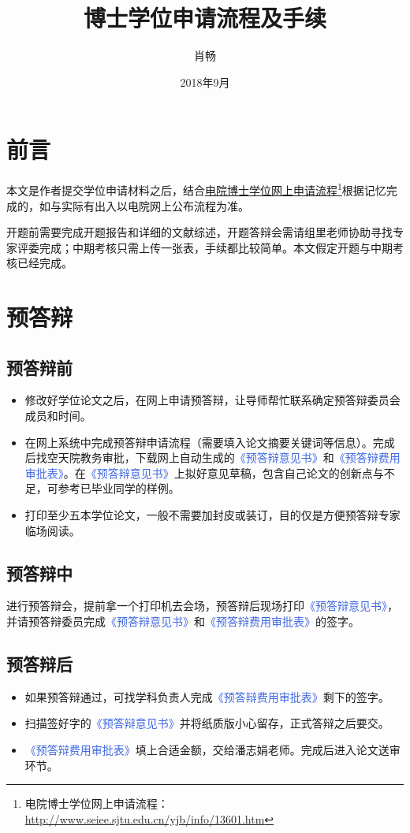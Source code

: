 \documentclass[a4paper, 12pt]{ctexart}
\title{博士学位申请流程及手续}
\author{肖畅}
\date{2018年9月}
\newcommand{\form}[1]{\textcolor{RoyalBlue}{《#1》}}
\begin{document}
\maketitle
\tableofcontents

\section{前言}
本文是作者提交学位申请材料之后，结合\href{http://www.seiee.sjtu.edu.cn/yjb/info/13601.htm}{电院博士学位网上申请流程}\footnote{电院博士学位网上申请流程：\url{http://www.seiee.sjtu.edu.cn/yjb/info/13601.htm}}根据记忆完成的，如与实际有出入以电院网上公布流程为准。

开题前需要完成开题报告和详细的文献综述，开题答辩会需请组里老师协助寻找专家评委完成；中期考核只需上传一张表，手续都比较简单。本文假定开题与中期考核已经完成。

\section{预答辩}
\subsection{预答辩前}
\begin{itemize}
    \item 修改好学位论文之后，在网上申请预答辩，让导师帮忙联系确定预答辩委员会成员和时间。
    \item 在网上系统中完成预答辩申请流程（需要填入论文摘要关键词等信息）。完成后找空天院教务审批，下载网上自动生成的\form{预答辩意见书}和\form{预答辩费用审批表}。在\form{预答辩意见书}上拟好意见草稿，包含自己论文的创新点与不足，可参考已毕业同学的样例。
    \item 打印至少五本学位论文，一般不需要加封皮或装订，目的仅是方便预答辩专家临场阅读。
\end{itemize}
\subsection{预答辩中}
进行预答辩会，提前拿一个打印机去会场，预答辩后现场打印\form{预答辩意见书}，并请预答辩委员完成\form{预答辩意见书}和\form{预答辩费用审批表}的签字。
\subsection{预答辩后}
\begin{itemize}
    \item 如果预答辩通过，可找学科负责人完成\form{预答辩费用审批表}剩下的签字。
    \item 扫描签好字的\form{预答辩意见书}并将纸质版小心留存，正式答辩之后要交。
    \item \form{预答辩费用审批表}填上合适金额，交给潘志娟老师。完成后进入论文送审环节。
\end{itemize}
\end{document}
